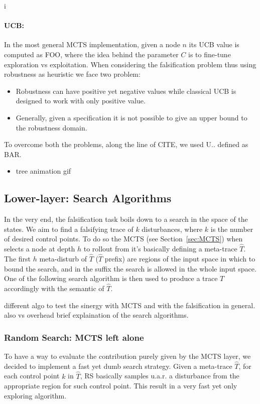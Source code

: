 \documentclass[11pt]{article}
\begin{document}
i\paragraph{UCB:} In the most general MCTS implementation, given a node $n$ its UCB value is computed as FOO, where the idea behind the parameter $C$ is to fine-tune exploration vs exploitation. When considering the falsification problem thus using robustness as heuristic we face two problem:
\begin{itemize}
    \item Robustness can have positive yet negative values while classical UCB is designed to work with only positive value. 
    \item Generally, given a specification it is not possible to give an upper bound to the robustness domain. 
\end{itemize}
To overcome both the problems, along the line of CITE, we used U.. defined as BAR.

\pagebreak
\begin{itemize}
    \item tree animation gif
\end{itemize}

\subsection{Lower-layer: Search Algorithms}
In the very end, the falsification task boils down to a search in the space of the states. 
We aim to find a falsifying trace of $k$ disturbances, where $k$ is the number of desired control points. 
To do so the MCTS (see Section~\ref{sec:MCTS}) when selects a node at depth $h$ to rollout from it's basically defining a meta-trace $\hat{T}$. The first $h$ meta-disturb of $\hat{T}$ ($\hat{T}$ prefix) are regions of the input space in which to bound the search, and in the suffix the search is allowed in the whole input space. 
One of the following search algorithm is then used to produce a trace $T$ accordingly with the semantic of $\hat{T}$.

different algo to test the sinergy with MCTS and with the falsification in general. also vs overhead
brief explaination of the search algorithms.

\subsubsection{Random Search: MCTS left alone}
To have a way to evaluate the contribution purely given by the MCTS layer, we decided to implement a fast yet dumb search strategy.
Given a meta-trace $\hat{T}$, for each control point $k$ in $\hat{T}$, RS basically samples u.a.r. a disturbance from the appropriate region for such control point.
This result in a very fast yet only exploring algorithm. 
\end{document}
